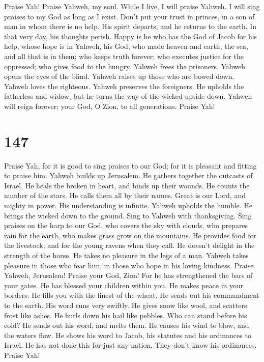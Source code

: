  Praise Yah! Praise Yahweh, my soul.  While
I live, I will praise Yahweh. I will sing praises to my God as long as I
exist.  Don't put your trust in princes, in a son of man
in whom there is no help.  His spirit departs, and he
returns to the earth. In that very day, his thoughts perish.
 Happy is he who has the God of Jacob for his help, whose
hope is in Yahweh, his God,  who made heaven and earth,
the sea, and all that is in them; who keeps truth forever;
 who executes justice for the oppressed; who gives food to
the hungry. Yahweh frees the prisoners.  Yahweh opens the
eyes of the blind. Yahweh raises up those who are bowed down. Yahweh
loves the righteous.  Yahweh preserves the foreigners. He
upholds the fatherless and widow, but he turns the way of the wicked
upside down.  Yahweh will reign forever; your God, O
Zion, to all generations. Praise Yah!

\hypertarget{section-146}{%
\section{147}\label{section-146}}

 Praise Yah, for it is good to sing praises to our God;
for it is pleasant and fitting to praise him.  Yahweh
builds up Jerusalem. He gathers together the outcasts of Israel.
 He heals the broken in heart, and binds up their wounds.
 He counts the number of the stars. He calls them all by
their names.  Great is our Lord, and mighty in power. His
understanding is infinite.  Yahweh upholds the humble. He
brings the wicked down to the ground.  Sing to Yahweh with
thanksgiving. Sing praises on the harp to our God,  who
covers the sky with clouds, who prepares rain for the earth, who makes
grass grow on the mountains.  He provides food for the
livestock, and for the young ravens when they call.  He
doesn't delight in the strength of the horse. He takes no pleasure in
the legs of a man.  Yahweh takes pleasure in those who
fear him, in those who hope in his loving kindness. 
Praise Yahweh, Jerusalem! Praise your God, Zion!  For he
has strengthened the bars of your gates. He has blessed your children
within you.  He makes peace in your borders. He fills you
with the finest of the wheat.  He sends out his
commandment to the earth. His word runs very swiftly.  He
gives snow like wool, and scatters frost like ashes.  He
hurls down his hail like pebbles. Who can stand before his cold?
 He sends out his word, and melts them. He causes his
wind to blow, and the waters flow.  He shows his word to
Jacob, his statutes and his ordinances to Israel.  He has
not done this for just any nation. They don't know his ordinances.
Praise Yah!

